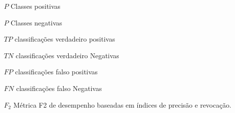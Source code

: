\begin{simbolos}
  \item[$ P $] Classes positivas
    \item[$ P $] Classes negativas
      \item[$ TP $] classificações verdadeiro positivas
      \item[$ TN $] classificações verdadeiro Negativas
      \item[$ FP $] classificações falso positivas
      \item[$ FN $] classificações falso Negativas
    \item[$ F_2 $] Métrica F2 de desempenho baseadas em índices de precisão e revocação. 
  
\end{simbolos}

